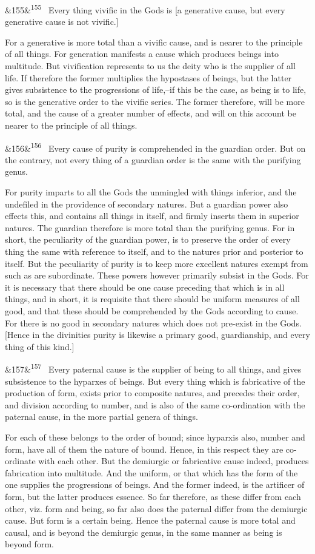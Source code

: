 \documentclass[12pt]{article}
\newcommand{\para}[1][]{\par\noindent\ifx&#1&\else\textsuperscript{\footnotesize #1}~\fi}
\begin{document}
\para[155] Every thing vivific in the Gods is [a generative cause, but every generative cause is not vivific.]

For a generative is more total than a vivific cause, and is nearer to the principle of all things. For generation manifests a cause which produces beings into multitude. But vivification represents to us the deity who is the supplier of all life. If therefore the former multiplies the hypostases of beings, but the latter gives subsistence to the progressions of life,--if this be the case, as being is to life, so is the generative order to the vivific series. The former therefore, will be more total, and the cause of a greater number of effects, and will on this account be nearer to the principle of all things.

\para[156] Every cause of purity is comprehended in the guardian order. But on the contrary, not every thing of a guardian order is the same with the purifying genus.

For purity imparts to all the Gods the unmingled with things inferior, and the undefiled in the providence of secondary natures. But a guardian power also effects this, and contains all things in itself, and firmly inserts them in superior natures. The guardian therefore is more total than the purifying genus. For in short, the peculiarity of the guardian power, is to preserve the order of every thing the same with reference to itself, and to the natures prior and posterior to itself. But the peculiarity of purity is to keep more excellent natures exempt from such as are subordinate. These powers however primarily subsist in the Gods. For it is necessary that there should be one cause preceding that which is in all things, and in short, it is requisite that there should be uniform measures of all good, and that these should be comprehended by the Gods according to cause. For there is no good in secondary natures which does not pre-exist in the Gods. [Hence in the divinities purity is likewise a primary good, guardianship, and every thing of this kind.]

\para[157] Every paternal cause is the supplier of being to all things, and gives subsistence to the hyparxes of beings. But every thing which is fabricative of the production of form, exists prior to composite natures, and precedes their order, and division according to number, and is also of the same co-ordination with the paternal cause, in the more partial genera of things.

For each of these belongs to the order of bound; since hyparxis also, number and form, have all of them the nature of bound. Hence, in this respect they are co-ordinate with each other. But the demiurgic or fabricative cause indeed, produces fabrication into multitude. And the uniform, or that which has the form of the one supplies the progressions of beings. And the former indeed, is the artificer of form, but the latter produces essence. So far therefore, as these differ from each other, viz. form and being, so far also does the paternal differ from the demiurgic cause. But form is a certain being. Hence the paternal cause is more total and causal, and is beyond the demiurgic genus, in the same manner as being is beyond form.
\end{document}
